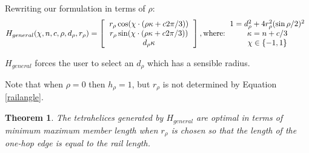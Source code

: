 \documentclass[11pt]{article}
\newtheorem{theorem}{Theorem}
\begin{document}
Rewriting our formulation in terms of $\rho$:
\begin{equation}
  \label{eq:general}
H_{general}(\chi,n,c,\rho,d_{\rho},r_{\rho}) =
\left [
  \begin{tabular}{c}
   $ r_{\rho} \cos(\chi \cdot (\rho \kappa + c 2 \pi /3)) $\\
   $ r_{\rho}  \sin(\chi \cdot (\rho \kappa + c 2 \pi /3)) $\\
   $ d_{\rho} \kappa $
  \end{tabular}
  \right ],
\text{where:}
\begin{tabular}{c}
  $   1 = d_{\rho}^2 + 4 r_{\rho}^2 (\sin{ \rho / 2})^2 $ \\
  $\kappa = n + c/3$ \\
    $\chi \in \{-1,1\}$ \\  
  \end{tabular}      
\end{equation}


$H_{general}$ forces the user to select an $d_{\rho}$
which has a sensible radius.

Note that when $\rho = 0$ then $h_{\rho} = 1$, but $r_{\rho}$ is not determined by
Equation \ref{railangle}.

\begin{theorem}
  \label{generalformulaoptimal}
  The tetrahelices generated by $H_{general}$ are optimal in terms of minimum maximum member length when $r_{\rho}$ is chosen so that
  the length of the one-hop edge is equal to the rail length.
\end{theorem}
\end{document}
